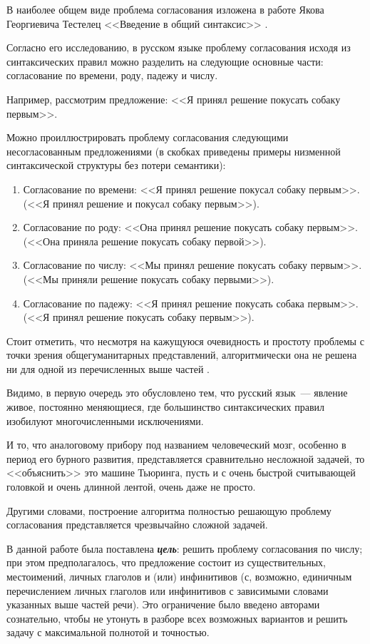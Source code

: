 \documentclass[main]{subfiles}
\begin{document}
В наиболее общем виде проблема согласования изложена в работе Якова Георгиевича Тестелец <<Введение в общий синтаксис>> \cite{test}.

Согласно его исследованию, в русском языке проблему согласования исходя из синтаксических правил можно разделить на следующие основные части: согласование по времени, роду, падежу и числу.

Например, рассмотрим предложение: <<Я принял решение покусать собаку первым>>.

Можно проиллюстрировать проблему согласования следующими несогласованным предложениями (в скобках приведены примеры низменной синтаксической структуры без потери семантики):
\begin{enumerate}
	\item Согласование по времени: <<Я принял решение покусал собаку первым>>. (<<Я принял решение и покусал собаку первым>>).
	\item Согласование по роду: <<Она принял решение покусать собаку первым>>. (<<Она приняла решение покусать собаку первой>>).
	\item Согласование по числу: <<Мы принял решение покусать собаку первым>>. (<<Мы приняли решение покусать собаку первыми>>).
	\item Согласование по падежу: <<Я принял решение покусать собака первым>>. (<<Я принял решение покусать собаку первым>>).
\end{enumerate}

Стоит отметить, что несмотря на кажущуюся очевидность и простоту проблемы с точки зрения общегуманитарных представлений, алгоритмически она не решена ни для одной из перечисленных выше частей \cite{langt}.

Видимо, в первую очередь это обусловлено тем, что русский язык~--- явление живое, постоянно меняющиеся, где большинство синтаксических правил изобилуют многочисленными исключениями.

И то, что аналоговому прибору под названием человеческий мозг, особенно в период его бурного развития, представляется сравнительно несложной задачей, то <<объяснить>> это машине Тьюринга, пусть и с очень быстрой считывающей головкой и очень длинной лентой, очень даже не просто.

Другими словами, построение алгоритма полностью решающую проблему согласования представляется чрезвычайно сложной задачей.

В данной работе была поставлена \textbf{\textit{цель}}: решить проблему согласования по числу; при этом предполагалось, что предложение состоит из существительных, местоимений, личных глаголов и (или) инфинитивов (с, возможно, единичным перечислением личных глаголов или инфинитивов с зависимыми словами указанных выше частей речи). Это ограничение было введено авторами сознательно, чтобы не утонуть в разборе всех возможных вариантов и решить задачу с максимальной полнотой и точностью.
\end{document}
